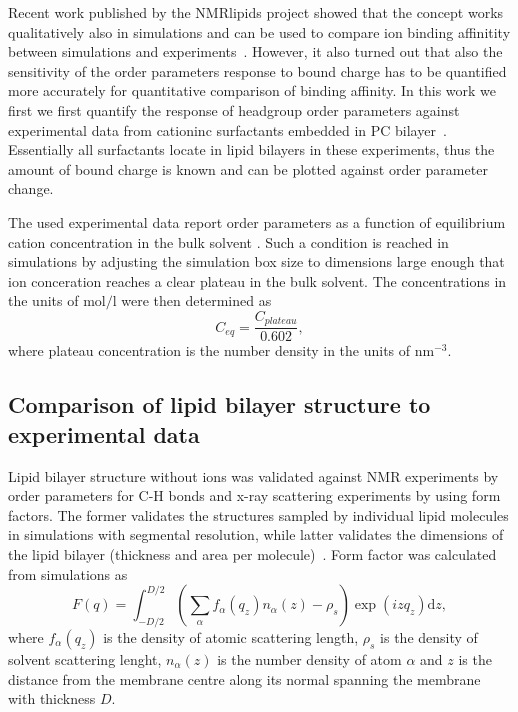 \documentclass[aip,jcp,twocolumn]{revtex4}
\begin{document}
Recent work published by the NMRlipids project showed that the concept works
qualitatively also in simulations and can be used to compare ion binding
affinitity between simulations and experiments~\cite{catte16}. However,
it also turned out that also the sensitivity of the order parameters response
to bound charge has to be quantified more accurately for quantitative comparison
of binding affinity. In this work we first we first quantify the response of
headgroup order parameters against experimental data from cationinc surfactants
embedded in PC bilayer~\cite{scherer89}. Essentially all surfactants locate in
lipid bilayers in these experiments, thus the amount of bound charge is known
and can be plotted against order parameter change.


The used experimental data report order parameters as a function of
equilibrium cation concentration in the bulk solvent \cite{akutsu81,altenbach84}.
Such a condition is reached in simulations by adjusting
the simulation box size to dimensions large enough
that ion conceration reaches a clear plateau in the bulk solvent.
The concentrations in the units of $\mathrm{mol/l}$ were then 
determined as
\begin{equation}
  C_{eq}=\frac{C_{plateau}}{0.602},
\end{equation}
where plateau concentration is the number density in the units of $\mathrm{nm}^{-3}$.

\subsection{Comparison of lipid bilayer structure to experimental data}
Lipid bilayer structure without ions was validated against NMR experiments
by order parameters for C-H bonds and x-ray scattering experiments by using
form factors. The former validates the structures sampled by individual
lipid molecules in simulations with segmental resolution, while latter
validates the dimensions of the lipid bilayer (thickness and area per
molecule)~\cite{ollila16}. Form factor was calculated from simulations
as 
\begin{equation}
  F(q) = \int _{-D/2} ^{D/2} \left ( \sum _\alpha f_\alpha (q_z) n_\alpha (z) - \rho _s \right ) \exp (izq_z) \mathrm{d}z,
\end{equation}
where $f_\alpha(q_z)$ is the density of atomic scattering length, 
$\rho_s$ is the density of solvent scattering lenght,
$n_\alpha (z)$ is the number density of atom $\alpha$ and
$z$ is the distance from the membrane centre along its normal 
spanning the membrane with thickness $D$. 
\end{document}

